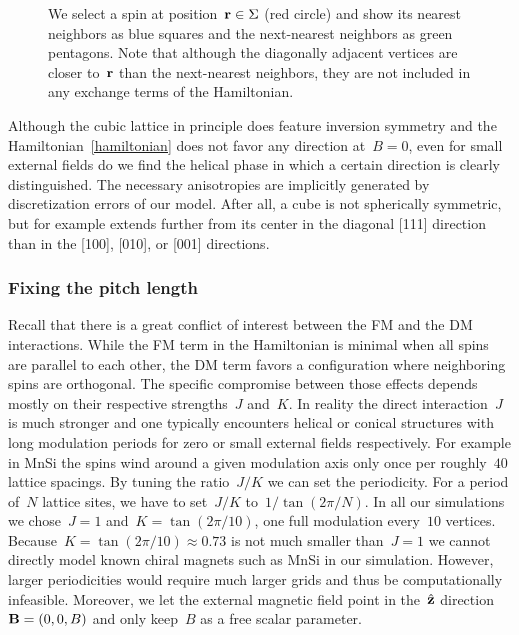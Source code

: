 \begin{figure}
  \centering
  \caption{We select a spin at position~$\mathbf{r} \in \Sigma$ (red circle) and show
  its nearest neighbors as blue squares and the next-nearest neighbors as green
  pentagons. Note that although the diagonally adjacent vertices are closer
  to~$\mathbf{r}$ than the next-nearest neighbors, they are not included in any
  exchange terms of the Hamiltonian.}
\label{fig:interact}
\end{figure}

Although the cubic lattice in principle does feature inversion symmetry and the
Hamiltonian~\eqref{hamiltonian} does not favor any direction at~$B=0$, even for
small external fields do we find the helical phase in which a certain direction
is clearly distinguished. The necessary anisotropies are implicitly generated by
discretization errors of our model. After all, a cube is not spherically
symmetric, but for example extends further from its center in the diagonal [111]
direction than in the [100], [010], or [001] directions.

\subsubsection{Fixing the pitch length}

Recall that there is a great conflict of interest between the FM and the DM
interactions. While the FM term in the Hamiltonian is minimal when all spins are
parallel to each other, the DM term favors a configuration where neighboring
spins are orthogonal. The specific compromise between those effects depends
mostly on their respective strengths~$J$ and~$K$. In reality the direct
interaction~$J$ is much stronger and one typically encounters helical or conical
structures with long modulation periods for zero or small external fields
respectively. For example in MnSi the spins wind around a given modulation axis
only once per roughly~$40$ lattice spacings. By tuning the ratio~$J/K$ we can
set the periodicity. For a period of~$N$ lattice sites, we have to set~$J/K$
to~$1/\tan(2\pi / N)$. In all our simulations we chose~$J=1$ and~$K=\tan(2\pi /
10)$, \ie{} one full modulation every~$10$ vertices. Because~$K=\tan(2\pi /
10)\approx 0.73$ is not much smaller than~$J=1$ we cannot directly model known
chiral magnets such as MnSi in our simulation. However, larger periodicities
would require much larger grids and thus be computationally infeasible.
Moreover, we let the external magnetic field point in the~$\hat{\mathbf{z}}$
direction~$\mathbf{B}=(0,0,B)$ and only keep~$B$ as a free scalar parameter.

